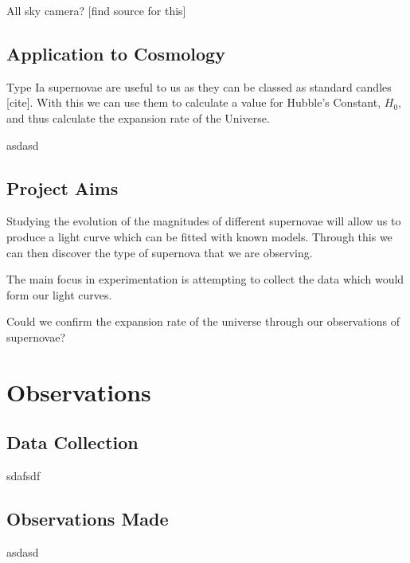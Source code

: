 \documentclass[twocolumn]{revtex4}
\begin{document}
All sky camera? [find source for this]

\vspace{-3ex}
\subsection{Application to Cosmology}
\vspace{-2ex}

Type Ia supernovae are useful to us as they can be classed as standard candles [cite]. With this we can use them to calculate a value for Hubble's Constant, $H_0$, and thus calculate the expansion rate of the Universe.

asdasd \cite{abs_phil}

\vspace{-3ex}
\subsection{Project Aims}
\vspace{-2ex}

Studying the evolution of the magnitudes of different supernovae will allow us to produce a light curve which can be fitted with known models. Through this we can then discover the type of supernova that we are observing. 

The main focus in experimentation is attempting to collect the data which would form our light curves. 

Could we confirm the expansion rate of the universe through our observations of supernovae? 

\vspace{-3ex}
\section{Observations} 
\vspace{-2ex}
\subsection{Data Collection}
\vspace{-2ex}

sdafsdf

\vspace{-3ex}
\subsection{Observations Made}
\vspace{-2ex}

asdasd
\end{document}
